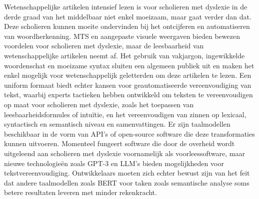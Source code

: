 Wetenschappelijke artikelen intensief lezen is voor scholieren met dyslexie in de derde graad van het middelbaar niet enkel moeizaam, maar gaat verder dan dat. Deze scholieren kunnen moeite ondervinden bij het ontcijferen en automatiseren van woordherkenning. MTS en aangepaste visuele weergaven bieden bewezen voordelen voor scholieren met dyslexie, maar de leesbaarheid van wetenschappelijke artikelen neemt af. Het gebruik van vakjargon, ingewikkelde woordenschat en moeizame syntax sluiten een algemeen publiek uit en maken het enkel mogelijk voor wetenschappelijk geletterden om deze artikelen te lezen. Een uniform formaat biedt echter kansen voor geautomatiseerde vereenvoudiging van tekst, waarbij experts tactieken hebben ontwikkeld om teksten te vereenvoudigen op maat voor scholieren met dyslexie, zoals het toepassen van leesbaarheidsformules of intuïtie, en het vereenvoudigen van zinnen op lexicaal, syntactisch en semantisch niveau en samenvattingen. Er zijn taalmodellen beschikbaar in de vorm van API's of open-source software die deze transformaties kunnen uitvoeren. Momenteel fungeert software die door de overheid wordt uitgeleend aan scholieren met dyslexie voornamelijk als voorleessoftware, maar nieuwe technologieën zoals GPT-3 en LLM's bieden mogelijkheden voor tekstvereenvoudiging. Ontwikkelaars moeten zich echter bewust zijn van het feit dat andere taalmodellen zoals BERT voor taken zoals semantische analyse soms betere resultaten leveren met minder rekenkracht.